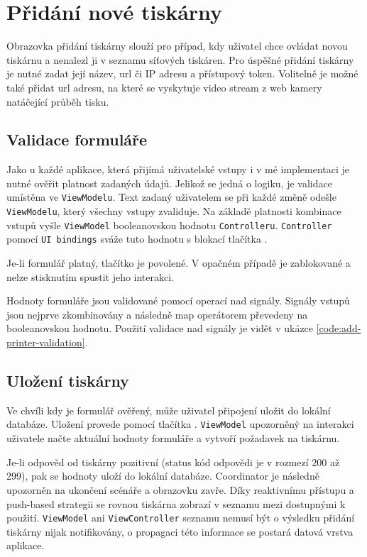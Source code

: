 \section{Přidání nové tiskárny}

Obrazovka přidání tiskárny slouží pro případ, kdy uživatel chce ovládat novou tiskárnu a nenalezl ji v seznamu síťových tiskáren.
Pro úspěšné přidání tiskárny je nutné zadat její název, \acrshort{url} či IP adresu a přístupový token.
Volitelně je možné také přidat url adresu, na které se vyskytuje video stream z web kamery natáčející průběh tisku.

\subsection{Validace formuláře}

Jako u každé aplikace, která přijímá uživatelské vstupy i v mé implementaci je nutné ověřit platnost zadaných údajů.
Jelikož se jedná o logiku, je validace umístěna ve \texttt{ViewModelu}.
Text zadaný uživatelem se při každé změně odešle \texttt{ViewModelu}, který všechny vstupy zvaliduje.
Na základě platnosti kombinace vstupů vyšle \texttt{ViewModel} booleanovskou hodnotu \texttt{Controlleru}.
\texttt{Controller} pomocí \texttt{UI bindings} sváže tuto hodnotu s blokací tlačítka . 

Je-li formulář platný, tlačítko je povolené.
V opačném případě je zablokované a nelze stisknutím spustit jeho interakci.

Hodnoty formuláře jsou validované pomocí operací nad signály.
Signály vstupů jsou nejprve zkombinovány a následně map operátorem převedeny na booleanovskou hodnotu.
Použití validace nad signály je vidět v ukázce \ref{code:add-printer-validation}.


\subsection{Uložení tiskárny}

Ve chvíli kdy je formulář ověřený, může uživatel připojení uložit do lokální databáze.
Uložení provede pomocí tlačítka .
\texttt{ViewModel} upozorněný na interakci uživatele načte aktuální hodnoty formuláře a vytvoří požadavek na tiskárnu.

Je-li odpověd od tiskárny pozitivní (status kód odpovědi je v rozmezí 200 až 299), pak se hodnoty uloží do lokální databáze.
Coordinator je následně upozorněn na ukončení scénáře a obrazovku zavře.
Díky reaktivnímu přístupu a push-based strategii se rovnou tiskárna zobrazí v seznamu mezi dostupnými k použití.
\texttt{ViewModel} ani \texttt{ViewController} seznamu nemusí být o výsledku přidání tiskárny nijak notifikovány, o propagaci této informace se postará datová vrstva aplikace.

